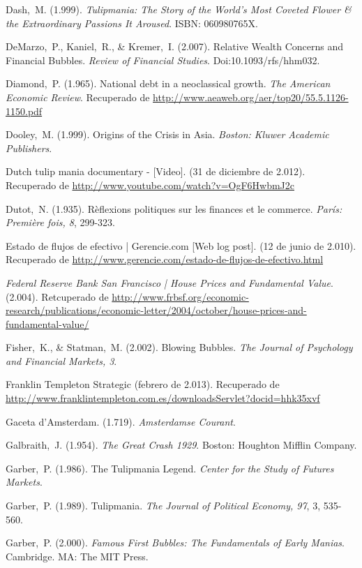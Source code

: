 \begin{thebibliography}{11}
	\bibitem{}
		Dash, M. (1.999). \emph{Tulipmania: The Story of the World's Most Coveted Flower \& the Extraordinary Passions It Aroused}. ISBN: 060980765X.

	\bibitem{}
		DeMarzo, P., Kaniel, R., \& Kremer, I. (2.007). Relative Wealth Concerns and Financial Bubbles. \emph{Review of Financial Studies}. Doi:10.1093/rfs/hhm032.

	\bibitem{}
		Diamond, P. (1.965). National debt in a neoclassical growth. \emph{The American Economic Review}. Recuperado de \url{http://www.aeaweb.org/aer/top20/55.5.1126-1150.pdf}

	\bibitem{}
		Dooley, M. (1.999). Origins of the Crisis in Asia. \emph{Boston: Kluwer Academic Publishers}. 

	\bibitem{}
		Dutch tulip mania documentary - [Video]. (31 de diciembre de 2.012). Recuperado de \url{http://www.youtube.com/watch?v=OgF6HwbmJ2c}

	\bibitem{}
		Dutot, N. (1.935). Rèflexions politiques sur les finances et le commerce. \emph{París: Première fois, 8}, 299-323.

	\bibitem{}
		Estado de flujos de efectivo | Gerencie.com [Web log post]. (12 de junio de 2.010). Recuperado de \url{http://www.gerencie.com/estado-de-flujos-de-efectivo.html}

	\bibitem{}
		\emph{Federal Reserve Bank San Francisco | House Prices and Fundamental Value}. (2.004). Retcuperado de \url{http://www.frbsf.org/economic-research/publications/economic-letter/2004/october/house-prices-and-fundamental-value/}

	\bibitem{}
		Fisher, K., \& Statman, M. (2.002). Blowing Bubbles. \emph{The Journal of Psychology and Financial Markets, 3}.

	\bibitem{}
		Franklin Templeton Strategic (febrero de 2.013). Recuperado de \url{http://www.franklintempleton.com.es/downloadsServlet?docid=hhk35xvf}

	\bibitem{}
		Gaceta d'Amsterdam. (1.719). \emph{Amsterdamse Courant}.  		

	\bibitem{}
		Galbraith, J. (1.954). \emph{The Great Crash 1929}. Boston: Houghton Mifflin Company. 

	\bibitem{}
		Garber, P. (1.986). The Tulipmania Legend. \emph{Center for the Study of Futures Markets}. 

	\bibitem{}
		Garber, P. (1.989). Tulipmania. \emph{The Journal of Political Economy, 97}, 3, 535-560.  	

	\bibitem{}
		Garber, P. (2.000). \emph{Famous First Bubbles: The Fundamentals of Early Manias}. Cambridge. MA: The MIT Press.


\end{thebibliography}
